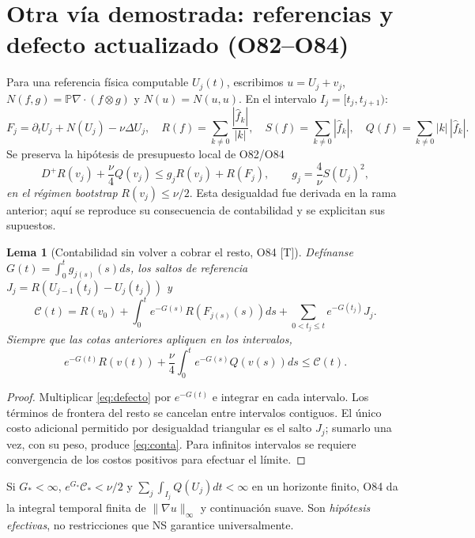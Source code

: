 \documentclass[11pt,a4paper]{article}
\newtheorem{lem}[teo]{Lema}
\theoremstyle{definition}\newtheorem{defi}[teo]{Definición}
\newcommand{\stat}[1]{\textcolor{blue!50!black}{\textsf{[#1]}}}
\begin{document}
\section{Otra vía demostrada: referencias y defecto actualizado (O82--O84)}
Para una referencia física computable $U_j(t)$, escribimos $u=U_j+v_j$, $N(f,g)=\mathbb P\nabla\cdot(f\otimes g)$ y $N(u)=N(u,u)$. En el intervalo $I_j=[t_j,t_{j+1})$:
\begin{equation}
F_j=\partial_tU_j+N(U_j)-\nu\Delta U_j,\quad
R(f)=\sum_{k\ne0}\frac{|\widehat f_k|}{|k|},\quad
S(f)=\sum_{k\ne0}|\widehat f_k|,\quad
Q(f)=\sum_{k\ne0}|k|\,|\widehat f_k|.
\end{equation}
Se preserva la hipótesis de presupuesto local de O82/O84
\begin{equation}\label{eq:defecto}
D^+R(v_j)+\frac\nu4Q(v_j)\le g_jR(v_j)+R(F_j),\qquad g_j=\frac4\nu S(U_j)^2,
\end{equation}
\emph{en el régimen bootstrap} $R(v_j)\le\nu/2$. Esta desigualdad fue derivada en la rama anterior; aquí se reproduce su consecuencia de contabilidad y se explicitan sus supuestos.

\begin{lem}[Contabilidad sin volver a cobrar el resto, O84 \stat{T}]
Defínanse $G(t)=\int_0^tg_{j(s)}(s)ds$, los saltos de referencia $J_j=R(U_{j-1}(t_j)-U_j(t_j))$ y
\[
\mathcal C(t)=R(v_0)+\int_0^te^{-G(s)}R(F_{j(s)}(s))ds
+\sum_{0<t_j\le t}e^{-G(t_j)}J_j.
\]
Siempre que las cotas anteriores apliquen en los intervalos,
\begin{equation}\label{eq:conta}
\boxed{e^{-G(t)}R(v(t))+\frac\nu4\int_0^te^{-G(s)}Q(v(s))ds\le\mathcal C(t).}
\end{equation}
\end{lem}
\begin{proof}
Multiplicar \eqref{eq:defecto} por $e^{-G(t)}$ e integrar en cada intervalo. Los términos de frontera del resto se cancelan entre intervalos contiguos. El único costo adicional permitido por desigualdad triangular es el salto $J_j$; sumarlo una vez, con su peso, produce \eqref{eq:conta}. Para infinitos intervalos se requiere convergencia de los costos positivos para efectuar el límite.
\end{proof}
\noindent Si $G_*<\infty$, $e^{G_*}\mathcal C_*<\nu/2$ y $\sum_j\int_{I_j}Q(U_j)dt<\infty$ en un horizonte finito, O84 da la integral temporal finita de $\|\nabla u\|_\infty$ y continuación suave. Son \emph{hipótesis efectivas}, no restricciones que NS garantice universalmente.
\end{document}

